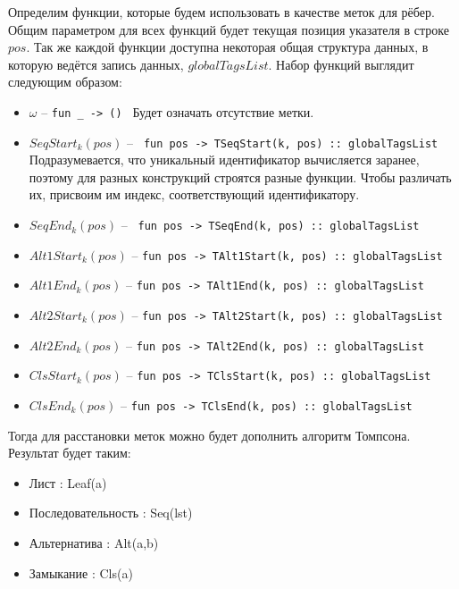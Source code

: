 \documentclass{article}
\begin{document}
Определим функции, которые будем использовать в качестве меток для рёбер. Общим параметром для всех функций будет текущая позиция указателя в строке $pos$. Так же каждой функции доступна некоторая общая структура данных, в которую ведётся запись данных, $globalTagsList$. Набор функций выглядит следующим образом:
  \begin{itemize}
    \item 
      $\omega          $ -- \verb|fun _ -> () |  Будет означать отсутствие метки.
    \item 
      $SeqStart_k(pos) $ -- \verb| fun pos -> TSeqStart(k, pos) :: globalTagsList| Подразумевается, что уникальный идентификатор вычисляется заранее, поэтому для разных конструкций строятся разные функции. Чтобы различать их, присвоим им индекс, соответствующий идентификатору.
    \item 
      $SeqEnd_k(pos)   $ -- \verb| fun pos -> TSeqEnd(k, pos) :: globalTagsList|  
    \item 
      $Alt1Start_k(pos)$ -- \verb|fun pos -> TAlt1Start(k, pos) :: globalTagsList|
    \item 
      $Alt1End_k(pos)  $ -- \verb|fun pos -> TAlt1End(k, pos) :: globalTagsList|
    \item 
      $Alt2Start_k(pos)$ -- \verb|fun pos -> TAlt2Start(k, pos) :: globalTagsList|
    \item 
      $Alt2End_k(pos)$   -- \verb|fun pos -> TAlt2End(k, pos) :: globalTagsList|
    \item 
      $ClsStart_k(pos)$  -- \verb|fun pos -> TClsStart(k, pos) :: globalTagsList|
    \item 
      $ClsEnd_k(pos)$    -- \verb|fun pos -> TClsEnd(k, pos) :: globalTagsList|
  \end{itemize}

Тогда для расстановки меток можно будет дополнить алгоритм Томпсона. Результат будет таким:
  \begin{itemize}
    \item
      Лист : Leaf(a) \
      \begin{flushleft}
        
      \end{flushleft}
    \item 
      Последовательность : Seq(lst) \
      \begin{flushleft}
        
      \end{flushleft}
    \item 
      Альтернатива : Alt(a,b) \
      \begin{flushleft}
        
      \end{flushleft}
    \item 
      Замыкание : Cls(a) \
      \begin{flushleft}
        
      \end{flushleft}
  \end{itemize}
\end{document}
